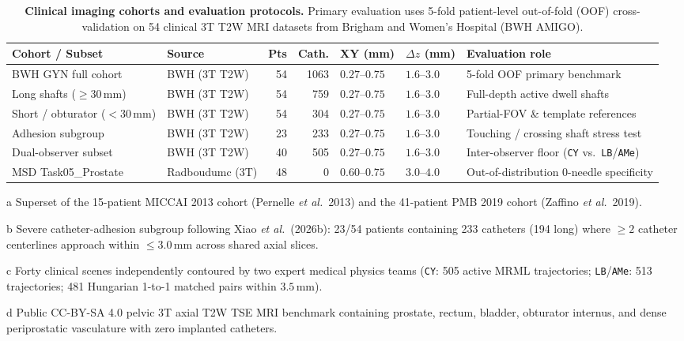 \begin{table}[tbp]
\centering
\begin{threeparttable}
\caption{\textbf{Clinical imaging cohorts and evaluation protocols.}
Primary evaluation uses 5-fold patient-level out-of-fold (OOF) cross-validation on 54 clinical 3T T2W MRI datasets from Brigham and Women's Hospital (BWH AMIGO).}
\label{tbl:cohorts}
\footnotesize
\setlength{\tabcolsep}{3.8pt}
\begin{tabular}{@{}L L R R L L L@{}}
\toprule
Cohort / Subset & Source & {Pts} & {Cath.} & {XY (mm)} & {$\Delta z$ (mm)} & {Evaluation role}\\
\midrule
BWH GYN full cohort & BWH (3T T2W) & 54 & 1063 & $0.27\text{--}0.75$ & $1.6\text{--}3.0$ & 5-fold OOF primary benchmark\\
\quad Long shafts ($\ge 30$\,mm) & BWH (3T T2W) & 54 & 759 & $0.27\text{--}0.75$ & $1.6\text{--}3.0$ & Full-depth active dwell shafts\\
\quad Short / obturator ($< 30$\,mm) & BWH (3T T2W) & 54 & 304 & $0.27\text{--}0.75$ & $1.6\text{--}3.0$ & Partial-FOV \& template references\\
\quad Adhesion subgroup & BWH (3T T2W) & 23 & 233 & $0.27\text{--}0.75$ & $1.6\text{--}3.0$ & Touching / crossing shaft stress test\\
Dual-observer subset & BWH (3T T2W) & 40 & 505 & $0.27\text{--}0.75$ & $1.6\text{--}3.0$ & Inter-observer floor (\texttt{CY} vs.\ \texttt{LB}/\texttt{AMe})\\
MSD Task05\_Prostate & Radboudumc (3T) & 48 & 0 & $0.60\text{--}0.75$ & $3.0\text{--}4.0$ & Out-of-distribution 0-needle specificity\\
\bottomrule
\end{tabular}
\begin{tablenotes}[flushleft]\footnotesize
\item[a] Superset of the 15-patient MICCAI 2013 cohort (Pernelle \emph{et al.}\ 2013) and the 41-patient PMB 2019 cohort (Zaffino \emph{et al.}\ 2019).
\item[b] Severe catheter-adhesion subgroup following Xiao \emph{et al.}\ (2026b): 23/54 patients containing 233 catheters (194 long) where $\ge 2$ catheter centerlines approach within $\le 3.0$\,mm across shared axial slices.
\item[c] Forty clinical scenes independently contoured by two expert medical physics teams (\texttt{CY}: 505 active MRML trajectories; \texttt{LB}/\texttt{AMe}: 513 trajectories; 481 Hungarian 1-to-1 matched pairs within $3.5$\,mm).
\item[d] Public CC-BY-SA 4.0 pelvic 3T axial T2W TSE MRI benchmark containing prostate, rectum, bladder, obturator internus, and dense periprostatic vasculature with zero implanted catheters.
\end{tablenotes}
\end{threeparttable}
\end{table}
